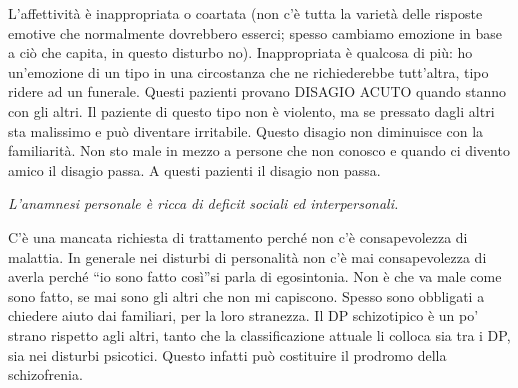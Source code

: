 L'affettività è inappropriata o coartata (non c'è tutta la varietà delle
risposte emotive che normalmente dovrebbero esserci; spesso cambiamo
emozione in base a ciò che capita, in questo disturbo no). Inappropriata
è qualcosa di più: ho un'emozione di un tipo in una circostanza che ne
richiederebbe tutt'altra, tipo ridere ad un funerale. Questi pazienti
provano DISAGIO ACUTO quando stanno con gli altri. Il paziente di questo
tipo non è violento, ma se pressato dagli altri sta malissimo e può
diventare irritabile. Questo disagio non diminuisce con la familiarità.
Non sto male in mezzo a persone che non conosco e quando ci divento
amico il disagio passa. A questi pazienti il disagio non passa.

\emph{\emph{L'anamnesi personale è ricca di deficit sociali ed
interpersonali. }}

C'è una mancata richiesta di trattamento perché non c'è consapevolezza
di malattia. In generale nei disturbi di personalità non c'è mai
consapevolezza di averla perché ``io sono fatto così''si parla di
egosintonia. Non è che va male come sono fatto, se mai sono gli altri
che non mi capiscono. Spesso sono obbligati a chiedere aiuto dai
familiari, per la loro stranezza. Il DP schizotipico è un po' strano
rispetto agli altri, tanto che la classificazione attuale li colloca sia
tra i DP, sia nei disturbi psicotici. Questo infatti può costituire il
prodromo della schizofrenia.

